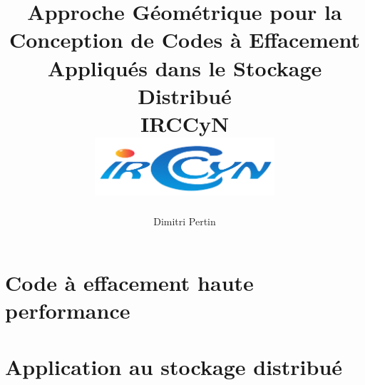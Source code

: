 
\makeindex



\title{
    {Approche Géométrique pour la Conception de Codes à Effacement Appliqués
    dans le Stockage Distribué}\\
    {\large IRCCyN}\\
    {\includegraphics[width=0.5\textwidth]{img/logo_irccyn.pdf}}
}
\author{Dimitri Pertin}
\date {}

\maketitle

\newpage

\dominitoc
\tableofcontents

\part{Code à effacement haute performance}







\part{Application au stockage distribué}







\newpage

\printbibliography[
]

\printindex


